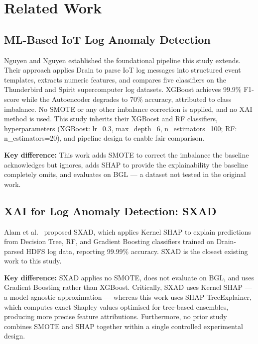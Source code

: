 \documentclass[conference]{IEEEtran}
\begin{document}
\section{Related Work}
\label{sec:related}

\subsection{ML-Based IoT Log Anomaly Detection}

Nguyen and Nguyen \cite{nguyen2023} established the foundational pipeline
this study extends. Their approach applies Drain to parse IoT log messages
into structured event templates, extracts numeric features, and compares five
classifiers on the Thunderbird and Spirit supercomputer log datasets. XGBoost
achieves 99.9\% F1-score while the Autoencoder degrades to 70\% accuracy,
attributed to class imbalance. No SMOTE or any other imbalance correction is
applied, and no XAI method is used. This study inherits their XGBoost and RF
classifiers, hyperparameters (XGBoost: lr=0.3, max\_depth=6,
n\_estimators=100; RF: n\_estimators=20), and pipeline design to enable fair
comparison.

\textbf{Key difference:} This work adds SMOTE to correct the imbalance the
baseline acknowledges but ignores, adds SHAP to provide the explainability
the baseline completely omits, and evaluates on BGL --- a dataset not tested
in the original work.

\subsection{XAI for Log Anomaly Detection: SXAD}

Alam et al.\ \cite{alam2024sxad} proposed SXAD, which applies Kernel SHAP to
explain predictions from Decision Tree, RF, and Gradient Boosting classifiers
trained on Drain-parsed HDFS log data, reporting 99.99\% accuracy. SXAD is
the closest existing work to this study.

\textbf{Key difference:} SXAD applies no SMOTE, does not evaluate on BGL,
and uses Gradient Boosting rather than XGBoost. Critically, SXAD uses Kernel
SHAP --- a model-agnostic approximation --- whereas this work uses SHAP
TreeExplainer, which computes exact Shapley values optimised for tree-based
ensembles, producing more precise feature attributions. Furthermore, no
prior study combines SMOTE and SHAP together within a single controlled
experimental design.
\end{document}
